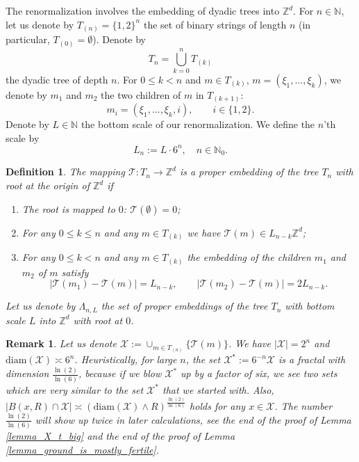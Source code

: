 \documentclass[a4paper,12pt]{article}
\newtheorem  {definition}    [theorem]{Definition}
\newtheorem  {remark}        [theorem]{Remark}
\begin{document}
The renormalization involves the embedding of dyadic trees into $\mathbb{Z}^d$. For $n \in \mathbb{N}$, let us denote by $T_{(n)}=\{1,2\}^n$ the set of binary strings of length $n$
 (in particular, $T_{(0)}=\emptyset$).
  Denote by
\begin{equation}
T_n =\bigcup_{k=0}^n T_{(k)}
\end{equation}
the dyadic tree of depth $n$.
For $0 \leq k < n$ and $m \in T_{(k)}$, $m=(\xi_1,\dots,\xi_k)$,  we denote
by $m_1$ and $m_2$ the two children of $m$ in $T_{(k+1)}$:
\begin{equation}\label{def_eq_m1_m2}
 m_i=(\xi_1,\dots,\xi_k,i), \qquad i \in \{ 1, 2 \}.
 \end{equation}
Denote by $L \in \mathbb{N}$ the bottom scale of our renormalization.  We define the $n$'th scale by
\begin{equation} \label{def:scalesLn}
L_n := L \cdot 6^n , \quad n \in \mathbb{N}_0.
\end{equation}

\begin{definition}\label{def_proper_embedding_of_trees}
 The mapping $\mathcal{T}: T_n \to \mathbb{Z}^d$ is a \emph{proper embedding} of the tree $T_n$  with
root at the origin of $\mathbb{Z}^d$ if
\begin{enumerate}
 \item The root is mapped to $0$: $\mathcal{T}(\emptyset)=0$;
\item For any $0 \leq k \leq n$ and any $m \in T_{(k)}$ we have $\mathcal{T}(m) \in L_{n-k} \mathbb{Z}^d$;
\item For any $0 \leq k < n$ and any $m \in T_{(k)}$ the embedding of the children $m_1$ and $m_2$ of $m$ satisfy
\begin{equation}\label{tree_children_spread_out}
|\mathcal{T}(m_1) -\mathcal{T}(m)|= L_{n-k}, \qquad |\mathcal{T}(m_2) -\mathcal{T}(m)|= 2 L_{n-k}.
\end{equation}
\end{enumerate}
Let us denote by $\Lambda_{n,L}$ the set of proper embeddings of the tree $T_n$ with bottom scale $L$ into $\mathbb{Z}^d$ with root at $0$.
\end{definition}

\begin{remark}\label{remark_fractal} Let us denote $\mathscr{X}:=\cup_{m \in T_{(n)} } \{ \mathcal{T}(m) \}$. We have $|\mathscr{X}|= 2^n$ and $\mathrm{diam}(\mathscr{X}) \asymp 6^n$.
  Heuristically, for large $n$,  the set $ \mathscr{X}^*:= 6^{-n}\mathscr{X}$ is a fractal  with
dimension $\frac{\ln(2)}{\ln(6)}$, because if we blow $ \mathscr{X}^*$  up by a factor of six, we see two sets which are very similar to the set $\mathscr{X}^*$ that we started with.
Also, $|B(x,R)\cap \mathscr{X}| \asymp (\mathrm{diam}(\mathscr{X}) \wedge R)^{\frac{\ln(2)}{\ln(6)}}$ holds for any $x \in \mathscr{X}$.
The number $\frac{\ln(2)}{\ln(6)}$ will show up twice in later calculations, see the end of the proof of Lemma \ref{lemma_X_t_big} and the end of the proof
of Lemma \ref{lemma_ground_is_mostly_fertile}.
\end{remark}
\end{document}

